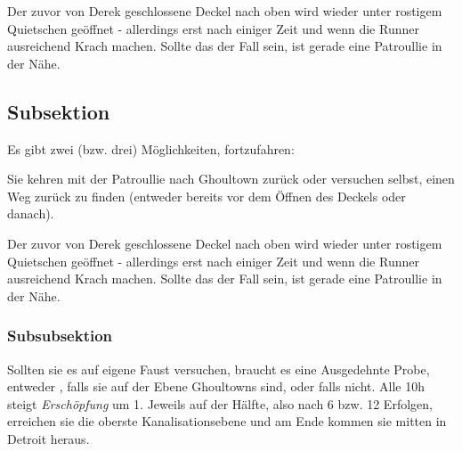 Der zuvor von Derek geschlossene Deckel nach oben wird wieder unter rostigem Quietschen geöffnet - allerdings erst nach einiger Zeit und wenn die Runner ausreichend Krach machen. Sollte das der Fall sein, ist gerade eine Patroullie in der Nähe.

\subsection{Subsektion}

Es gibt zwei (bzw. drei) Möglichkeiten, fortzufahren:

Sie kehren mit der Patroullie nach Ghoultown zurück oder versuchen selbst, einen Weg zurück zu finden (entweder bereits vor dem Öffnen des Deckels oder danach). 

Der zuvor von Derek geschlossene Deckel nach oben wird wieder unter rostigem Quietschen geöffnet - allerdings erst nach einiger Zeit und wenn die Runner ausreichend Krach machen. Sollte das der Fall sein, ist gerade eine Patroullie in der Nähe.

\subsubsection{Subsubsektion}
Sollten sie es auf eigene Faust versuchen, braucht es eine Ausgedehnte Probe, entweder , falls sie auf der Ebene Ghoultowns sind, oder  falls nicht. Alle 10h steigt \emph{Erschöpfung} um 1. Jeweils auf der Hälfte, also nach 6 bzw. 12 Erfolgen, erreichen sie die oberste Kanalisationsebene und am Ende kommen sie mitten in Detroit heraus. 
